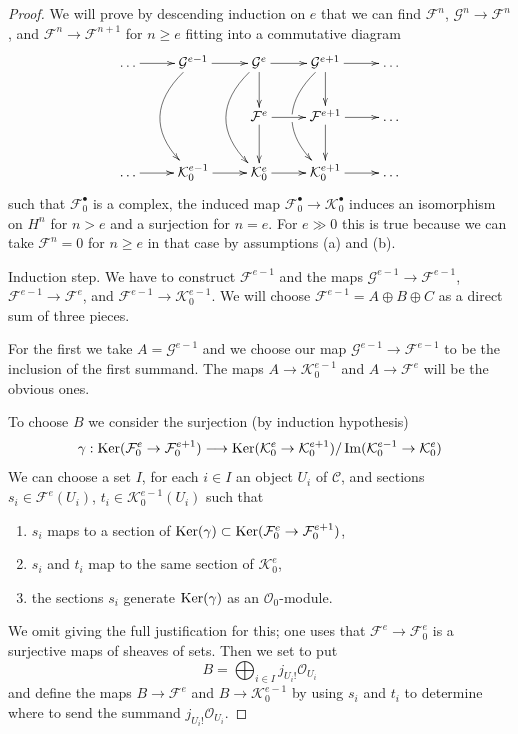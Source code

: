 \begin{proof}
We will prove by descending induction on $e$ that we can find $\mathcal{F}^n$,
$\mathcal{G}^n \to \mathcal{F}^n$, and
$\mathcal{F}^n \to \mathcal{F}^{n + 1}$ for $n \geq e$
fitting into a commutative diagram
$$
\xymatrix{
\ldots \ar[r] &
\mathcal{G}^{e - 1} \ar[r] \ar@/_2pc/[dd] &
\mathcal{G}^e \ar[d] \ar[r] \ar@/_2pc/[dd] &
\mathcal{G}^{e + 1} \ar[d] \ar[r] \ar@/_2pc/[dd]|\hole &
\ldots \\
& &
\mathcal{F}^e \ar[d] \ar[r] &
\mathcal{F}^{e + 1} \ar[d] \ar[r] & \ldots \\
\ldots  \ar[r] &
\mathcal{K}_0^{e - 1} \ar[r] &
\mathcal{K}_0^e \ar[r] &
\mathcal{K}_0^{e + 1} \ar[r] & \ldots
}
$$
such that $\mathcal{F}_0^\bullet$ is a complex,
the induced map $\mathcal{F}_0^\bullet \to \mathcal{K}_0^\bullet$
induces an isomorphism on $H^n$ for $n > e$ and a surjection
for $n = e$. For $e \gg 0$ this is true because we can take
$\mathcal{F}^n = 0$ for $n \geq e$ in that case by assumptions
(a) and (b).

\medskip\noindent
Induction step. We have to construct $\mathcal{F}^{e - 1}$
and the maps $\mathcal{G}^{e - 1} \to \mathcal{F}^{e - 1}$,
$\mathcal{F}^{e - 1} \to \mathcal{F}^e$, and
$\mathcal{F}^{e - 1} \to \mathcal{K}_0^{e - 1}$.
We will choose $\mathcal{F}^{e - 1} = A \oplus B \oplus C$
as a direct sum of three pieces.

\medskip\noindent
For the first we take $A = \mathcal{G}^{e - 1}$ and we choose our map
$\mathcal{G}^{e - 1} \to \mathcal{F}^{e - 1}$ to be the inclusion of
the first summand. The maps $A \to \mathcal{K}^{e - 1}_0$
and $A \to \mathcal{F}^e$ will be the obvious ones.

\medskip\noindent
To choose $B$ we consider the surjection (by induction hypothesis)
$$
\gamma :
\mathop{\mathrm{Ker}}(\mathcal{F}^e_0 \to \mathcal{F}^{e + 1}_0)
\longrightarrow
\mathop{\mathrm{Ker}}(\mathcal{K}^e_0 \to \mathcal{K}^{e + 1}_0)/
\mathop{\mathrm{Im}}(\mathcal{K}^{e - 1}_0 \to \mathcal{K}^e_0)
$$
We can choose a set $I$, for each $i \in I$
an object $U_i$ of $\mathcal{C}$, and sections
$s_i \in \mathcal{F}^e(U_i)$, $t_i \in \mathcal{K}^{e - 1}_0(U_i)$
such that
\begin{enumerate}
\item $s_i$ maps to a section of $\mathop{\mathrm{Ker}}(\gamma) \subset
\mathop{\mathrm{Ker}}(\mathcal{F}^e_0 \to \mathcal{F}^{e + 1}_0)$,
\item $s_i$ and $t_i$ map to the same section of
$\mathcal{K}^e_0$,
\item the sections $s_i$ generate $\mathop{\mathrm{Ker}}(\gamma)$ as an $\mathcal{O}_0$-module.
\end{enumerate}
We omit giving the full justification for this;
one uses that $\mathcal{F}^e \to \mathcal{F}^e_0$
is a surjective maps of sheaves of sets. Then we set
to put
$$
B = \bigoplus\nolimits_{i \in I} j_{U_i!}\mathcal{O}_{U_i}
$$
and define the maps $B \to \mathcal{F}^e$ and $B \to \mathcal{K}_0^{e - 1}$
by using $s_i$ and $t_i$ to determine where to send the summand
$j_{U_i!}\mathcal{O}_{U_i}$.


\end{proof}
